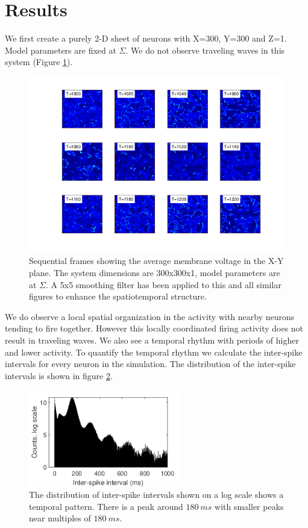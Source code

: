 \documentclass[12pt]{article}
\begin{document}
\section{Results}
We first create a purely 2-D sheet of neurons with X=300, Y=300 and Z=1.
Model parameters are fixed at $\Sigma$.
We do not observe traveling waves in this system (Figure \ref{fig:Pure2DRasters_NoWaves}).
\begin{figure}[!htb]
 \caption{Sequential frames showing the average membrane voltage in the X-Y plane.
          The system dimensions are 300x300x1, model parameters are at $\Sigma$. 
	  A 5x5 smoothing filter has been applied to this and all similar figures to enhance the spatiotemporal structure.}
 \label{fig:Pure2DRasters_NoWaves}
 \centering
   \includegraphics[width=\textwidth]{fig/2D_1LayerNoWaves}
\end{figure}
\FloatBarrier

We do observe a local spatial organization in the activity with nearby neurons tending to fire together.
However this locally coordinated firing activity does not result in traveling waves.
We also see a temporal rhythm with periods of higher and lower activity.
To quantify the temporal rhythm we calculate the inter-spike intervals for every neuron in the simulation.
The distribution of the inter-spike intervals is shown in figure \ref{fig:2D1LayerRhythm}.
\begin{figure}[!htb]
 \caption{The distribution of inter-spike intervals shown on a log scale shows a temporal pattern.
          There is a peak around $180~ms$ with smaller peaks near multiples of $180~ms$.
         }
 \label{fig:2D1LayerRhythm}
 \centering
   \includegraphics[width=0.6\textwidth]{fig/2D_1Layer_ISI_log}
\end{figure}
\end{document}
